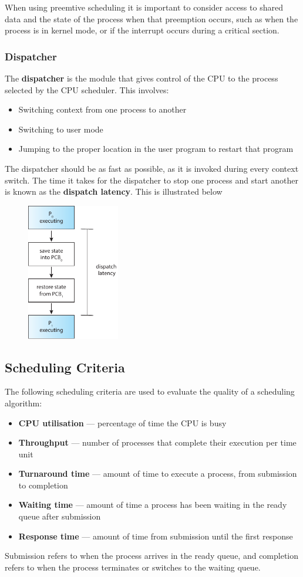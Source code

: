 \documentclass{article}
\begin{document}
When using preemtive scheduling it is important to consider access to
shared data and the state of the process when that preemption occurs,
such as when the process is in kernel mode, or if the interrupt occurs
during a critical section.
\subsubsection{Dispatcher}
The \textbf{dispatcher} is the module that gives control of the CPU to
the process selected by the CPU scheduler. This involves:
\begin{itemize}
    \item Switching context from one process to another
    \item Switching to user mode
    \item Jumping to the proper location in the user program to restart
          that program
\end{itemize}
The dispatcher should be as fast as possible, as it is invoked during
every context switch. The time it takes for the dispatcher to stop one
process and start another is known as the \textbf{dispatch latency}.
This is illustrated below
\begin{figure}[H]
    \centering
    \includegraphics[height = 6cm]{figures/dispatcher.pdf}
\end{figure}
\subsection{Scheduling Criteria}
The following scheduling criteria are used to evaluate the quality of a
scheduling algorithm:
\begin{itemize}
    \item \textbf{CPU utilisation} --- percentage of time the CPU is
          busy
    \item \textbf{Throughput} --- number of processes that complete
          their execution per time unit
    \item \textbf{Turnaround time} --- amount of time to execute a
          process, from submission to completion
    \item \textbf{Waiting time} --- amount of time a process has been
          waiting in the ready queue after submission
    \item \textbf{Response time} --- amount of time from submission
          until the first response
\end{itemize}
Submission refers to when the process arrives in the ready queue, and
completion refers to when the process terminates or switches to the
waiting queue.
\end{document}

